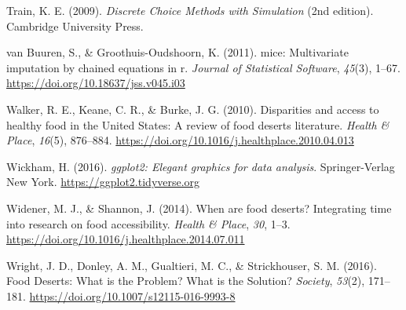 \documentclass[
  letterpaper,
  number,
  review,
  3p]{elsarticle}
\newlength{\cslhangindent}
\newenvironment{CSLReferences}[2] %
 {\begin{list}{}{%
  \setlength{\itemindent}{0pt}
  \setlength{\leftmargin}{0pt}
  \setlength{\parsep}{0pt}
  \ifodd #1
   \setlength{\leftmargin}{\cslhangindent}
   \setlength{\itemindent}{-1\cslhangindent}
  \fi
  \setlength{\itemsep}{#2\baselineskip}}}
 {\end{list}}
\begin{document}
\begin{CSLReferences}{1}{0}
Train, K. E. (2009). \emph{Discrete {Choice Methods} with {Simulation}}
(2nd edition). Cambridge University Press.

van Buuren, S., \& Groothuis-Oudshoorn, K. (2011). {mice}: Multivariate
imputation by chained equations in r. \emph{Journal of Statistical
Software}, \emph{45}(3), 1--67.
\url{https://doi.org/10.18637/jss.v045.i03}

Walker, R. E., Keane, C. R., \& Burke, J. G. (2010). Disparities and
access to healthy food in the {United States}: {A} review of food
deserts literature. \emph{Health \& Place}, \emph{16}(5), 876--884.
\url{https://doi.org/10.1016/j.healthplace.2010.04.013}

Wickham, H. (2016). \emph{ggplot2: Elegant graphics for data analysis}.
Springer-Verlag New York. \url{https://ggplot2.tidyverse.org}

Widener, M. J., \& Shannon, J. (2014). When are food deserts?
{Integrating} time into research on food accessibility. \emph{Health \&
Place}, \emph{30}, 1--3.
\url{https://doi.org/10.1016/j.healthplace.2014.07.011}

Wright, J. D., Donley, A. M., Gualtieri, M. C., \& Strickhouser, S. M.
(2016). Food {Deserts}: {What} is the {Problem}? {What} is the
{Solution}? \emph{Society}, \emph{53}(2), 171--181.
\url{https://doi.org/10.1007/s12115-016-9993-8}

\end{CSLReferences}
\end{document}
